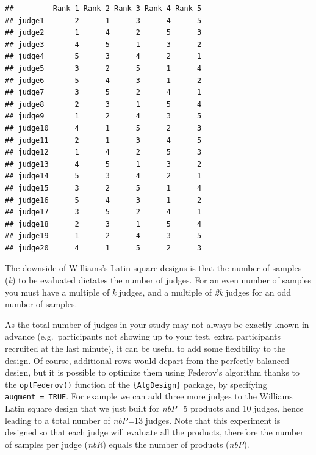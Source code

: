 \documentclass[
]{krantz}
\begin{document}
\begin{verbatim}
##         Rank 1 Rank 2 Rank 3 Rank 4 Rank 5
## judge1       2      1      3      4      5
## judge2       1      4      2      5      3
## judge3       4      5      1      3      2
## judge4       5      3      4      2      1
## judge5       3      2      5      1      4
## judge6       5      4      3      1      2
## judge7       3      5      2      4      1
## judge8       2      3      1      5      4
## judge9       1      2      4      3      5
## judge10      4      1      5      2      3
## judge11      2      1      3      4      5
## judge12      1      4      2      5      3
## judge13      4      5      1      3      2
## judge14      5      3      4      2      1
## judge15      3      2      5      1      4
## judge16      5      4      3      1      2
## judge17      3      5      2      4      1
## judge18      2      3      1      5      4
## judge19      1      2      4      3      5
## judge20      4      1      5      2      3
\end{verbatim}

The downside of Williams's Latin square designs is that the number of samples (\emph{k}) to be evaluated dictates the number of judges. For an even number of samples you must have a multiple of \emph{k} judges, and a multiple of \emph{2k} judges for an odd number of samples.

As the total number of judges in your study may not always be exactly known in advance (e.g.~participants not showing up to your test, extra participants recruited at the last minute), it can be useful to add some flexibility to the design. Of course, additional rows would depart from the perfectly balanced design, but it is possible to optimize them using Federov's algorithm thanks to the \texttt{optFederov()} function of the \texttt{\{AlgDesign\}} package, by specifying \texttt{augment\ =\ TRUE}. For example we can add three more judges to the Williams Latin square design that we just built for \emph{nbP=}5 products and 10 judges, hence leading to a total number of \emph{nbP=}13 judges. Note that this experiment is designed so that each judge will evaluate all the products, therefore the number of samples per judge (\emph{nbR}) equals the number of products (\emph{nbP}).
\end{document}
